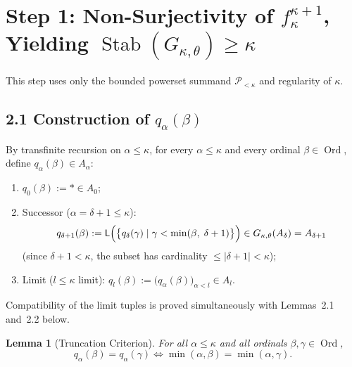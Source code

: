 \documentclass[11pt,a4paper]{article}
\theoremstyle{definition}
\theoremstyle{plain}
\newtheorem{lemma}[definition]{Lemma}
\newcommand{\Stab}{\operatorname{Stab}}
\newcommand{\Ord}{\operatorname{Ord}}
\begin{document}
\section{Step 1: Non-Surjectivity of $f_\kappa^{\kappa+1}$, Yielding $\Stab(G_{\kappa,\theta}) \ge \kappa$}

This step uses only the bounded powerset summand $\mathcal{P}_{<\kappa}$ and regularity of $\kappa$.

\subsection*{2.1 Construction of $q_\alpha(\beta)$}

By transfinite recursion on $\alpha \le \kappa$, for every $\alpha \le \kappa$ and every ordinal $\beta \in \Ord$, define $q_\alpha(\beta) \in A_\alpha$:
\begin{enumerate}[label=(\arabic*)]
  \item $q_0(\beta) := * \in A_0$;
  \item Successor ($\alpha = \delta + 1 \le \kappa$):
    \[
      q_{\delta+1}(\beta) := \mathsf{L}\Bigl(\bigl\{ q_\delta(\gamma) \mid \gamma < \min(\beta,\; \delta+1) \bigr\}\Bigr) \in G_{\kappa,\theta}(A_\delta) = A_{\delta+1}
    \]
    (since $\delta + 1 < \kappa$, the subset has cardinality $\le |\delta+1| < \kappa$);
  \item Limit ($l \le \kappa$ limit): $q_l(\beta) := \bigl(q_\alpha(\beta)\bigr)_{\alpha < l} \in A_l$.
\end{enumerate}
Compatibility of the limit tuples is proved simultaneously with Lemmas~2.1 and~2.2 below.

\begin{lemma}[Truncation Criterion]
For all $\alpha \le \kappa$ and all ordinals $\beta, \gamma \in \Ord$,
\[
  q_\alpha(\beta) = q_\alpha(\gamma) \iff \min(\alpha, \beta) = \min(\alpha, \gamma).
\]
\end{lemma}
\end{document}
